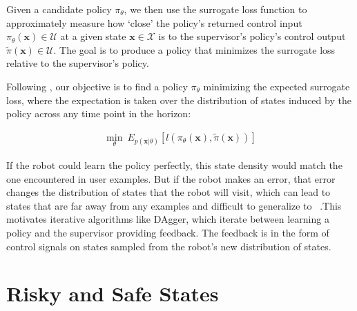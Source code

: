 \documentclass[10pt, conference]{ieeeconf}      %
\newcommand{\bx}{\mathbf{x}}
\begin{document}
Given a candidate policy $\pi_{\theta}$, we then use the surrogate loss function to approximately measure how `close' the policy's
returned control input $\pi_{\theta}(\bx)\in \mathcal{U}$ at a given state $\bx\in \mathcal{X}$ is to the supervisor's policy's control output
$\tilde{\pi}(\bx)\in \mathcal{U}$. The goal is to produce a policy that minimizes the surrogate loss relative to the supervisor's policy.


Following \cite{ross2010reduction}, our objective is to find a policy $\pi_{\theta}$ minimizing the expected surrogate loss, where the expectation is taken over the distribution of states induced by the policy across any time point in the horizon:

 \vspace{-2ex}
\begin{align}\label{eq:LFD_obj}
\underset{\theta}{\min} \: E_{p(\bx|\theta)} [l(\pi_\theta(\bx),\tilde{\pi}(\bx))]
\end{align}

 If the robot could learn the policy  perfectly, this state density would match the one encountered in user examples. But if the robot makes an error, that error changes the distribution of states that the robot will visit, which can lead to states that are far away from any examples and difficult to generalize to ~\cite{pomerleau1989alvinn}.This motivates iterative algorithms like DAgger, which iterate between learning a policy and the supervisor providing feedback. The feedback is in the form of control signals on states sampled from the robot's new distribution of states. 

\section{Risky and Safe States}
\end{document}
